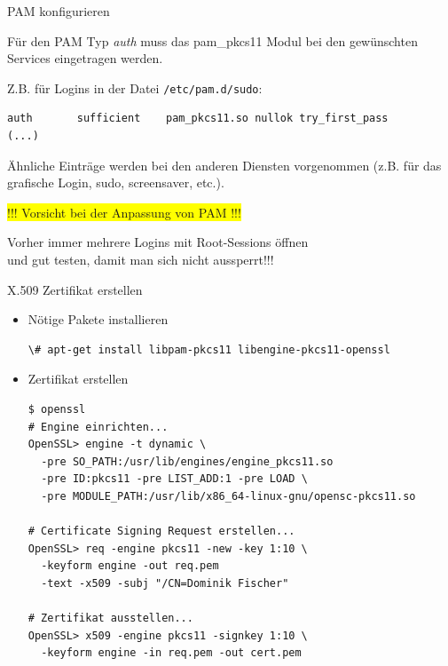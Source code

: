 \documentclass{beamer}
\begin{document}
\begin{frame}[fragile]{PAM konfigurieren}
\begin{minipage}[t][\textheight][t]{\linewidth}
Für den PAM Typ \emph{auth} muss das pam\_pkcs11 Modul bei den
gewünschten Services eingetragen werden. 

Z.B. für Logins in der  Datei \lstinline|/etc/pam.d/sudo|:
\begin{lstlisting}
auth       sufficient    pam_pkcs11.so nullok try_first_pass 
(...)
\end{lstlisting}
Ähnliche Einträge werden bei den anderen Diensten vorgenommen
(z.B. für das grafische Login, sudo, screensaver, etc.).

\vspace{10mm}

\colorbox{yellow}{!!! Vorsicht bei der Anpassung von PAM !!!}

Vorher immer mehrere Logins mit Root-Sessions öffnen \\
und gut testen, damit man sich nicht aussperrt!!!

\end{minipage}
\end{frame}

\begin{frame}[fragile]{X.509 Zertifikat erstellen}
\begin{minipage}[t][\textheight][t]{\linewidth}
\begin{itemize}
	\item Nötige Pakete installieren
	\begin{lstlisting}
\# apt-get install libpam-pkcs11 libengine-pkcs11-openssl
	\end{lstlisting}
	\item Zertifikat erstellen
	\begin{lstlisting}
$ openssl
# Engine einrichten...
OpenSSL> engine -t dynamic \
  -pre SO_PATH:/usr/lib/engines/engine_pkcs11.so
  -pre ID:pkcs11 -pre LIST_ADD:1 -pre LOAD \
  -pre MODULE_PATH:/usr/lib/x86_64-linux-gnu/opensc-pkcs11.so

# Certificate Signing Request erstellen...
OpenSSL> req -engine pkcs11 -new -key 1:10 \
  -keyform engine -out req.pem
  -text -x509 -subj "/CN=Dominik Fischer"

# Zertifikat ausstellen...
OpenSSL> x509 -engine pkcs11 -signkey 1:10 \
  -keyform engine -in req.pem -out cert.pem
    \end{lstlisting}
\end{itemize}
\end{minipage}
\end{frame}
\end{document}
